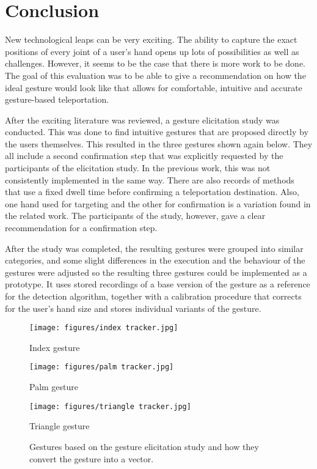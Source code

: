 \chapter{Conclusion}

New technological leaps can be very exciting. The ability to capture the exact positions of every joint of a user's hand opens up lots of possibilities as well as challenges. However, it seems to be the case that there is more work to be done. The goal of this evaluation was to be able to give a recommendation on how the ideal gesture would look like that allows for comfortable, intuitive and accurate gesture-based teleportation. 

After the exciting literature was reviewed, a gesture elicitation study was conducted. This was done to find intuitive gestures that are proposed directly by the users themselves. This resulted in the three gestures shown again below. They all include a second confirmation step that was explicitly requested by the participants of the elicitation study. In the previous work, this was not consistently implemented in the same way. There are also records of methods that use a fixed dwell time before confirming a teleportation destination. Also, one hand used for targeting and the other for confirmation is a variation found in the related work. The participants of the study, however, gave a clear recommendation for a confirmation step. 

After the study was completed, the resulting gestures were grouped into similar categories, and some slight differences in the execution and the behaviour of the gestures were adjusted so the resulting three gestures could be implemented as a prototype. It uses stored recordings of a base version of the gesture as a reference for the detection algorithm, together with a calibration procedure that corrects for the user's hand size and stores individual variants of the gesture.

\begin{figure}[!h]
        \texttt{[image: figures/index tracker.jpg]}
        \caption{Index gesture}
    \endminipage\hfill
        \texttt{[image: figures/palm tracker.jpg]}
        \caption{Palm gesture}
    \endminipage
        \texttt{[image: figures/triangle tracker.jpg]}
        \caption{Triangle gesture}
    \endminipage
    \hfill
    \caption{Gestures based on the gesture elicitation study and how they convert the gesture into a vector.}
\end{figure}

